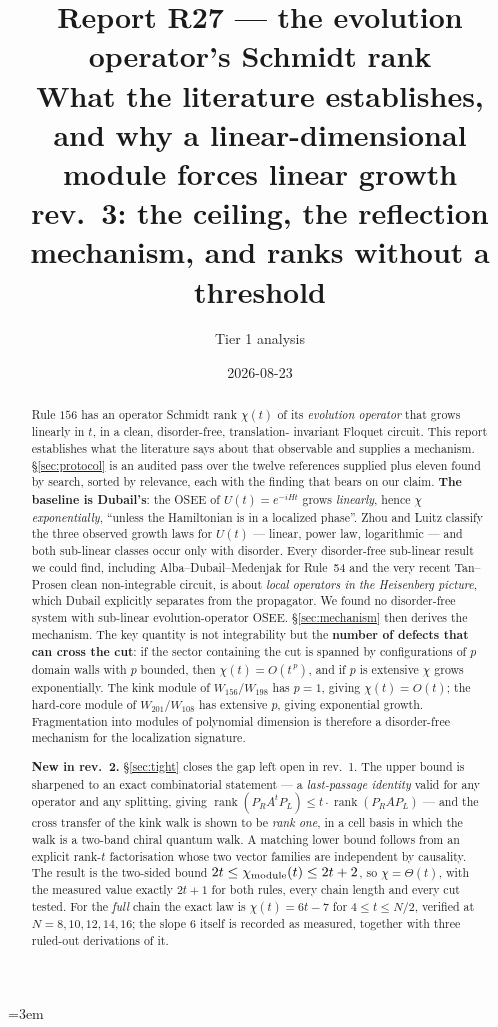 \documentclass[11pt]{article}
\title{\textbf{Report R27 --- the evolution operator's Schmidt rank}\\
\large What the literature establishes, and why a linear-dimensional module
forces linear growth\\[2pt]
\normalsize rev.\ 3: the ceiling, the reflection mechanism, and ranks without a
threshold}
\author{Tier 1 analysis}
\date{2026-08-23}
\theoremstyle{plain}
\theoremstyle{remark}
\begin{document}
\maketitle
\sloppy
\emergencystretch=3em

\begin{abstract}
Rule $156$ has an operator Schmidt rank $\chi(t)$ of its \emph{evolution
operator} that grows linearly in $t$, in a clean, disorder-free, translation-%
invariant Floquet circuit. This report establishes what the literature says
about that observable and supplies a mechanism. \S\ref{sec:protocol} is an
audited pass over the twelve references supplied plus eleven found by search,
sorted by relevance, each with the finding that bears on our claim.
\textbf{The baseline is Dubail's}: the OSEE of $U(t)=e^{-iHt}$ grows
\emph{linearly}, hence $\chi$ \emph{exponentially}, ``unless the Hamiltonian is
in a localized phase''. Zhou and Luitz classify the three observed growth laws
for $U(t)$ --- linear, power law, logarithmic --- and both sub-linear classes
occur only with disorder. Every disorder-free sub-linear result we could find,
including Alba--Dubail--Medenjak for Rule~54 and the very recent
Tan--Prosen clean non-integrable circuit, is about \emph{local operators in the
Heisenberg picture}, which Dubail explicitly separates from the propagator. We
found no disorder-free system with sub-linear evolution-operator OSEE.
\S\ref{sec:mechanism} then derives the mechanism. The key quantity is not
integrability but the \textbf{number of defects that can cross the cut}: if the
sector containing the cut is spanned by configurations of $p$ domain walls with
$p$ bounded, then $\chi(t) = O(t^{\,p})$, and if $p$ is extensive $\chi$ grows
exponentially. The kink module of $W_{156}/W_{198}$ has $p=1$, giving
$\chi(t) = O(t)$; the hard-core module of $W_{201}/W_{108}$ has extensive $p$,
giving exponential growth. Fragmentation into modules of polynomial dimension is
therefore a disorder-free mechanism for the localization signature.

\textbf{New in rev.\ 2.} \S\ref{sec:tight} closes the gap left open in rev.\ 1.
The upper bound is sharpened to an exact combinatorial statement --- a
\emph{last-passage identity} valid for any operator and any splitting, giving
$\operatorname{rank}(P_RA^tP_L)\le t\cdot\operatorname{rank}(P_RAP_L)$ --- and
the cross transfer of the kink walk is shown to be \emph{rank one}, in a cell
basis in which the walk is a two-band chiral quantum walk. A matching lower
bound follows from an explicit rank-$t$ factorisation whose two vector families
are independent by causality. The result is the two-sided bound
$2t \le \chi_{\rm module}(t)\le 2t+2$, so $\chi=\Theta(t)$, with the measured
value exactly $2t+1$ for both rules, every chain length and every cut tested.
For the \emph{full} chain the exact law is $\chi(t)=6t-7$ for
$4\le t\le N/2$, verified at $N=8,10,12,14,16$; the slope $6$ itself is recorded
as measured, together with three ruled-out derivations of it.


\end{abstract}
\end{document}
